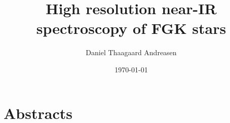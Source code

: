 \documentclass[a4paper,
11pt,
twoside,
fleqn
]{memoir}
\begin{document}
    \title{High resolution near-IR spectroscopy of FGK stars}
    \author{Daniel Thaagaard Andreasen}
    \date{\today}
    \maketitle
\frontmatter
%


\cleardoublepage
\thispagestyle{empty}


\tableofcontents  %
\thispagestyle{empty}

\newpage
\chapter*{Abstracts}
\newpage
\listoffigures
\listoftables
\mainmatter









\thispagestyle{empty}


%    


\backmatter


\nocite{} %
\end{document}

